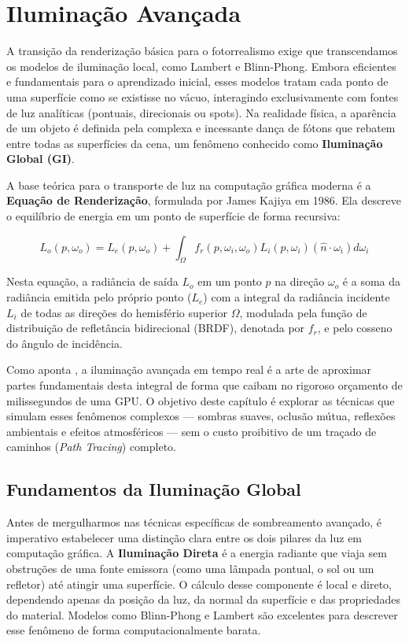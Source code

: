 \chapter{Iluminação Avançada}

A transição da renderização básica para o fotorrealismo exige que transcendamos os modelos de iluminação local, como Lambert e Blinn-Phong. Embora eficientes e fundamentais para o aprendizado inicial, esses modelos tratam cada ponto de uma superfície como se existisse no vácuo, interagindo exclusivamente com fontes de luz analíticas (pontuais, direcionais ou spots). Na realidade física, a aparência de um objeto é definida pela complexa e incessante dança de fótons que rebatem entre todas as superfícies da cena, um fenômeno conhecido como \textbf{Iluminação Global (GI)}. 

A base teórica para o transporte de luz na computação gráfica moderna é a \textbf{Equação de Renderização}, formulada por James Kajiya em 1986. Ela descreve o equilíbrio de energia em um ponto de superfície de forma recursiva:

\begin{equation}
    L_o(p, \omega_o) = L_e(p, \omega_o) + \int_{\Omega} f_r(p, \omega_i, \omega_o) L_i(p, \omega_i) (\hat{n} \cdot \omega_i) d\omega_i
\end{equation}

Nesta equação, a radiância de saída $L_o$ em um ponto $p$ na direção $\omega_o$ é a soma da radiância emitida pelo próprio ponto ($L_e$) com a integral da radiância incidente $L_i$ de todas as direções do hemisfério superior $\Omega$, modulada pela função de distribuição de refletância bidirecional (BRDF), denotada por $f_r$, e pelo cosseno do ângulo de incidência.

Como aponta \textcite{akenine2018realtime}, a iluminação avançada em tempo real é a arte de aproximar partes fundamentais desta integral de forma que caibam no rigoroso orçamento de milissegundos de uma GPU. O objetivo deste capítulo é explorar as técnicas que simulam esses fenômenos complexos — sombras suaves, oclusão mútua, reflexões ambientais e efeitos atmosféricos — sem o custo proibitivo de um traçado de caminhos (\textit{Path Tracing}) completo.

\section{Fundamentos da Iluminação Global}

Antes de mergulharmos nas técnicas específicas de sombreamento avançado, é imperativo estabelecer uma distinção clara entre os dois pilares da luz em computação gráfica. A \textbf{Iluminação Direta} é a energia radiante que viaja sem obstruções de uma fonte emissora (como uma lâmpada pontual, o sol ou um refletor) até atingir uma superfície. O cálculo desse componente é local e direto, dependendo apenas da posição da luz, da normal da superfície e das propriedades do material. Modelos como Blinn-Phong e Lambert são excelentes para descrever esse fenômeno de forma computacionalmente barata.

